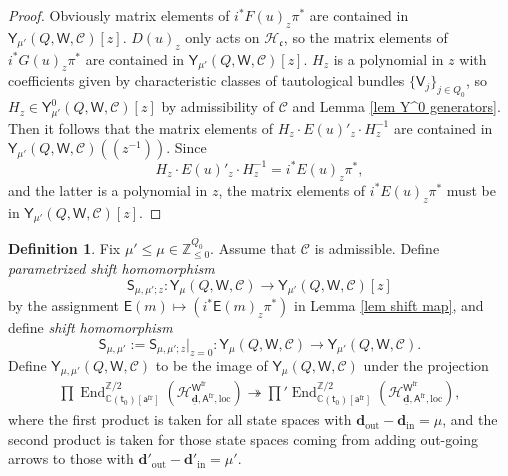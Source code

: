 \documentclass[10pt]{amsart}
\theoremstyle{definition}
\newtheorem{Definition}[Theorem]{Definition}
\numberwithin{equation}{section}
\newcommand{\bC}{\mathbb{C}}
\newcommand{\bZ}{\mathbb{Z}}
\newcommand{\bd}{\mathbf{d}}
\newcommand{\cH}{\mathcal{H}}
\newcommand{\sS}{\mathsf{S}}
\newcommand{\sW}{\mathsf{W}}
\newcommand{\End}{\operatorname{End}}
\newcommand{\In}{\operatorname{in}}
\newcommand{\Out}{\operatorname{out}}
\begin{document}
\begin{proof}
Obviously matrix elements of $i^*F(u)_z\pi^*$ are contained in $\mathsf Y_{\mu'}(Q,\sW,\mathcal C)[z]$.
$D(u)_z$ only acts on $\cH_{\mathfrak{c}}$, so the matrix elements of $i^*G(u)_z\pi^*$ are contained in $\mathsf Y_{\mu'}(Q,\sW,\mathcal C)[z]$. $H_z$ is a polynomial in $z$ with coefficients given by characteristic classes of tautological bundles $\{\mathsf V_j\}_{j\in Q_0}$, so $H_z\in\mathsf Y^0_{\mu'}(Q,\sW,\mathcal C)[z]$ by admissibility of $\mathcal C$ and Lemma \ref{lem Y^0 generators}. Then it follows that the matrix elements of $H_z\cdot E(u)'_z\cdot H^{-1}_z$ are contained in $\mathsf Y_{\mu'}(Q,\sW,\mathcal C)(\!(z^{-1})\!)$. Since $$H_z\cdot E(u)'_z\cdot H^{-1}_z=i^*E(u)_z\pi^*,$$ and the latter is a polynomial in $z$, the matrix elements of $i^*E(u)_z\pi^*$ must be in $\mathsf Y_{\mu'}(Q,\sW,\mathcal C)[z]$. 
\end{proof}


\begin{Definition}
Fix $\mu'\leqslant \mu\in \bZ_{\leqslant 0}^{Q_0}$.
Assume that $\mathcal C$ is admissible. Define \textit{parametrized shift homomorphism} $$\sS_{\mu,\mu';z}\colon \mathsf Y_{\mu}(Q,\sW,\mathcal C)\to \mathsf Y_{\mu'}(Q,\sW,\mathcal C)[z]$$ by the assignment $\mathsf E(m)\mapsto \left(i^*\mathsf E(m)_{z}\pi^*\right)$ in Lemma \ref{lem shift map}, and define \textit{shift homomorphism} $$\sS_{\mu,\mu'}:=\sS_{\mu,\mu';z}\big|_{z=0}\colon \mathsf Y_{\mu}(Q,\sW,\mathcal C)\to \mathsf Y_{\mu'}(Q,\sW,\mathcal C).$$
Define $\mathsf Y_{\mu,\mu'}(Q,\sW,\mathcal C)$ to be the image of $\mathsf Y_{\mu}(Q,\sW,\mathcal C)$ under the projection
\begin{align*}
    \prod\End^{\bZ/2}_{\bC(\mathsf t_0)[\mathsf a^{\mathrm{fr}}]}(\cH^{\sW^{\mathrm{fr}}}_{\underline{\bd},\mathsf A^{\mathrm{fr}},\mathrm{loc}})\twoheadrightarrow{\prod}'\End^{\bZ/2}_{\bC(\mathsf t_0)[\mathsf a^{\mathrm{fr}}]}(\cH^{\sW^{\mathrm{fr}}}_{\underline{\bd},\mathsf A^{\mathrm{fr}},\mathrm{loc}}),
\end{align*}
where the first product is taken for all state spaces with $\bd_{\Out}-\bd_{\In}=\mu$, and the second product is taken for those state spaces coming from adding out-going arrows to those with $\bd'_{\Out}-\bd'_{\In}=\mu'$.
\end{Definition}
\end{document}
